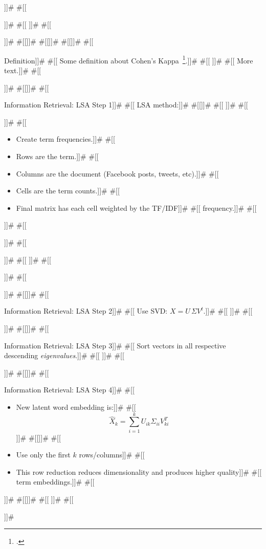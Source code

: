 \documentclass[11pt,pdf,handout]{beamer}
\begin{document}
]]#
#[[\begin{frame}]]#
#[[  \titlepage]]#
#[[\end{frame}]]#
#[[]]#
#[[]]#
#[[]]#
#[[\begin{frame}{Definition}]]#
#[[  Some definition about Cohen's Kappa~\footcite{cohenWeightedKappaNominal1968}.]]#
#[[  \pause]]#
#[[  More text.]]#
#[[\end{frame}]]#
#[[]]#
#[[\begin{frame}{Information Retrieval: LSA Step 1}]]#
#[[  LSA method:]]#
#[[]]#
#[[  \vspace{0.3cm}]]#
#[[  \begin{minipage}{0.46\textwidth}]]#
#[[    \begin{itemize}]]#
#[[    \item Create term frequencies.]]#
#[[    \item Rows are the term.]]#
#[[    \item Columns are the document (Facebook posts, tweets, etc).]]#
#[[    \item Cells are the term counts.]]#
#[[    \item Final matrix has each cell weighted by the TF/IDF]]#
#[[      frequency.]]#
#[[    \end{itemize}]]#
#[[  \end{minipage}]]#
#[[  \begin{minipage}{0.46\textwidth}]]#
#[[  ]]#
#[[  \end{minipage}]]#
#[[\end{frame}]]#
#[[]]#
#[[\begin{frame}{Information Retrieval: LSA Step 2}]]#
#[[  Use SVD: $X = U \, \Sigma V^t$.]]#
#[[  ]]#
#[[\end{frame}]]#
#[[]]#
#[[\begin{frame}{Information Retrieval: LSA Step 3}]]#
#[[  Sort vectors in all respective descending {\it eigenvalues}.]]#
#[[  ]]#
#[[\end{frame}]]#
#[[]]#
#[[\begin{frame}{Information Retrieval: LSA Step 4}]]#
#[[  \begin{itemize}]]#
#[[  \item New latent word embedding is:]]#
#[[    \[ \hat{X}_k = \sum_{i=1}^{k} U_{ik} \Sigma_{ii} V_{ki}^T \]]]#
#[[]]#
#[[  \item Use only the first $k$ rows/columns]]#
#[[  \item This row reduction reduces dimensionality and produces higher quality]]#
#[[    term embeddings.]]#
#[[  \end{itemize}]]#
#[[]]#
#[[  ]]#
#[[\end{frame}]]#
\end{document}
